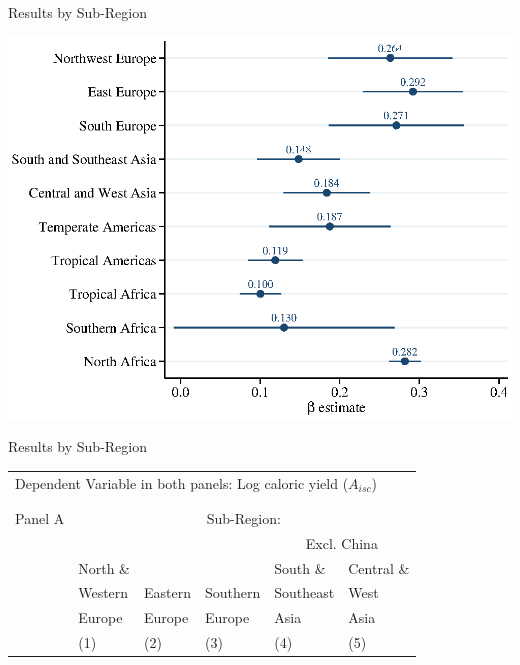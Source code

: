 \documentclass[10pt, xcolor=dvipsnames]{beamer}
\begin{document}
\begin{frame}{Results by Sub-Region}
\begin{center}
\includegraphics[width=.8\textwidth]{fig_coef_subregion.eps}
\end{center}
\end{frame}

\begin{frame}{Results by Sub-Region}

{\scriptsize
\begin{tabularx}{\textwidth}{lXXXXX}
\midrule
\multicolumn{6}{l}{Dependent Variable in both panels: Log caloric yield ($A_{isc}$)} \\ \\
\\
Panel A & \multicolumn{5}{c}{Sub-Region:} \\ \cmidrule{2-6}
 &          &         &             &  \multicolumn{2}{c}{Excl. China} \\ \cmidrule(lr){5-6}
 & North \& &         &              & South \&  & Central \&             \\
 & Western  & Eastern & Southern     & Southeast & West        \\
 & Europe   & Europe  & Europe       & Asia      & Asia      \\
 & (1) & (2) & (3) & (4) & (5) \\
\midrule

\midrule
\end{tabularx}
}
\end{frame}
\end{document}
